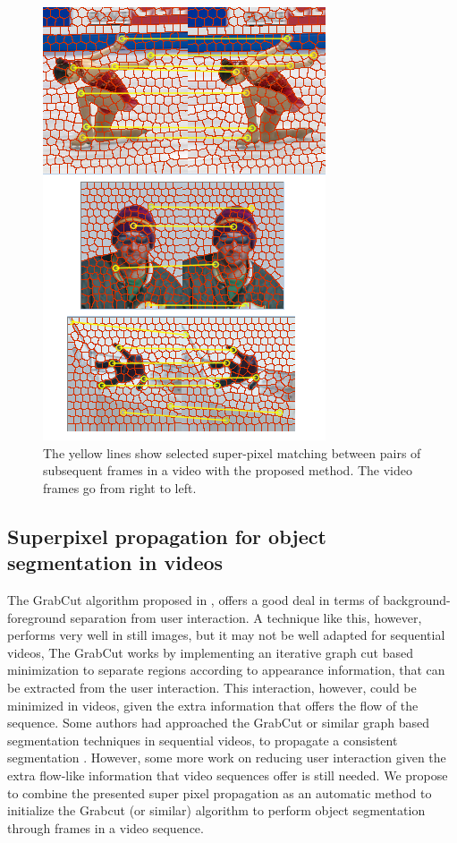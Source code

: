 \documentclass[a4paper, 10pt, conference]{ieeeconf}      %
\begin{document}
   \begin{figure}[thpb]
      \centering
      \includegraphics[height=0.33\textheight]{images/matches.png}
      \caption{The yellow lines show selected super-pixel
		matching between pairs of subsequent frames in a video
		with the proposed method. The video frames go from right
		to left.}
      \label{figurelabel_matches}
   \end{figure}
   
   
\subsection{Superpixel propagation for object segmentation in videos}
The GrabCut algorithm proposed in \cite{c14}, offers a good deal in terms of
background-foreground separation from user interaction. A technique like this, however,
performs very well in still images, but it may not be well adapted for sequential videos, 
The GrabCut works by implementing an iterative graph cut based 
minimization to separate regions according to appearance information, that can be
extracted from the user interaction. This interaction, however, could be minimized in videos,
given the extra information that offers the flow of the sequence.
Some authors had approached the GrabCut or similar
graph based segmentation techniques in sequential
videos, to propagate a consistent segmentation \cite{c15}.
However, some more work on reducing user interaction given the extra flow-like information
that video sequences offer is still needed.
We propose to combine the presented super pixel
propagation as an automatic method to initialize the
Grabcut (or similar) algorithm to perform object
segmentation through frames in a video sequence. \\
\end{document}
